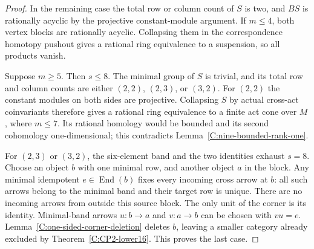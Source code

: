 \begin{proof}
In the remaining case the total row or column count of
$S$ is two, and $BS$ is rationally acyclic by the projective
constant-module argument.  If $m\leq4$, both vertex blocks
are rationally acyclic.  Collapsing them in the correspondence
homotopy pushout gives a rational ring equivalence to a
suspension, so all products vanish.

Suppose $m\geq5$.  Then $s\leq8$.  The minimal group of
$S$ is trivial, and its total row and column counts are
either $(2,2)$, $(2,3)$, or $(3,2)$.  For $(2,2)$ the
constant modules on both sides are projective.  Collapsing
$S$ by actual cross-act coinvariants therefore gives a
rational ring equivalence to a finite act cone over $M$,
where $m\leq7$.  Its rational homology would be bounded
and its second cohomology one-dimensional; this contradicts
Lemma~\ref{C:nine-bounded-rank-one}.

For $(2,3)$ or $(3,2)$, the six-element band and the two
identities exhaust $s=8$.  Choose an object $b$ with one
minimal row, and another object $a$ in the block.  Any
minimal idempotent $e\in\operatorname{End}(b)$ fixes every
incoming cross arrow at $b$: all such arrows belong to the
minimal band and their target row is unique.  There are
no incoming arrows from outside this source block.  The
only unit of the corner is its identity.  Minimal-band
arrows $u:b\to a$ and $v:a\to b$ can be chosen with
$vu=e$.  Lemma~\ref{C:one-sided-corner-deletion} deletes
$b$, leaving a smaller category already excluded by
Theorem~\ref{C:CP2-lower16}.  This proves the last case.
\end{proof}
